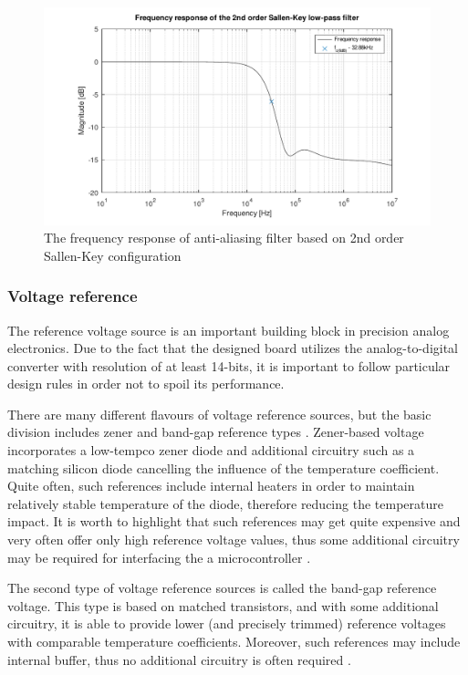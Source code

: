 \documentclass[12pt,a4paper]{article}
\begin{document}
\begin{figure}[ht!]
\includegraphics[scale=0.77]{sallenresponse.pdf}
\caption{The frequency response of anti-aliasing filter based on 2nd order Sallen-Key configuration}
\label{fig:sallenresponse}
\end{figure}

\subsubsection{Voltage reference}

The reference voltage source is an important building block in precision analog electronics. Due to the fact that the designed board utilizes the analog-to-digital converter with resolution of at least 14-bits, it is important to follow particular design rules in order not to spoil its performance.
\par

There are many different flavours of voltage reference sources, but the basic division includes zener and band-gap reference types \cite{companion}. Zener-based voltage incorporates a low-tempco zener diode and additional circuitry such as a matching silicon diode cancelling the influence of the temperature coefficient. Quite often, such references include internal heaters in order to maintain relatively stable temperature of the diode, therefore reducing the temperature impact. It is worth to highlight that such references may get quite expensive and very often offer only high reference voltage values, thus some additional circuitry may be required for interfacing the a microcontroller \cite{companion}.
\par

The second type of voltage reference sources is called the band-gap reference voltage. This type is based on matched transistors, and with some additional circuitry, it is able to provide lower (and precisely trimmed) reference voltages with comparable temperature coefficients. Moreover, such references may include internal buffer, thus no additional circuitry is often required \cite{companion}.
\par
\end{document}
